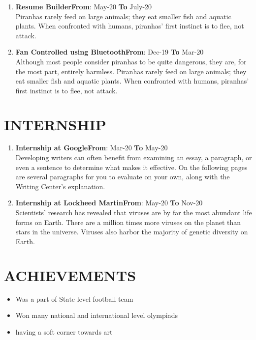\documentclass{article}
\begin{document}
\vspace{3pt}
\begin{enumerate}
	\item {\textbf{Resume Builder}}\hfill {\textbf{From}}: May-20 {\textbf{To}} July-20\\
	Piranhas rarely feed on large animals; they eat smaller fish and aquatic plants. When confronted with humans, piranhas' first instinct is to flee, not attack. 
	\item {\textbf{Fan Controlled using Bluetooth}}\hfill {\textbf{From}}: Dec-19 {\textbf{To}} Mar-20\\
	Although most people consider piranhas to be quite dangerous, they are, for the most part, entirely harmless. Piranhas rarely feed on large animals; they eat smaller fish and aquatic plants. When confronted with humans, piranhas' first instinct is to flee, not attack. 
\end{enumerate}
	
\vspace{3pt}
\section*{\large{\uppercase{Internship}}}

\vspace{3pt}
\begin{enumerate}
	\item {\textbf{Internship at Google}}\hfill {\textbf{From}}: Mar-20 {\textbf{To}} May-20\\
	Developing writers can often benefit from examining an essay, a paragraph, or even a sentence to determine what makes it effective. On the following pages are several paragraphs for you to evaluate on your own, along with the Writing Center's explanation.
	\item {\textbf{Internship at Lockheed Martin}}\hfill {\textbf{From}}: May-20 {\textbf{To}} Nov-20\\
	 Scientists' research has revealed that viruses are by far the most abundant life forms on Earth. There are a million times more viruses on the planet than stars in the universe. Viruses also harbor the majority of genetic diversity on Earth. 
\end{enumerate}

\vspace{3pt}

\section*{\large{\uppercase{achievements}}}

\vspace{3pt}
\begin{itemize}[noitemsep,nolistsep]
	\item Was a part of State level football team
	\item Won many national and international level olympiads
	\item having a soft corner towards art
\end{itemize}
 

\vspace{3pt}
\end{document}
